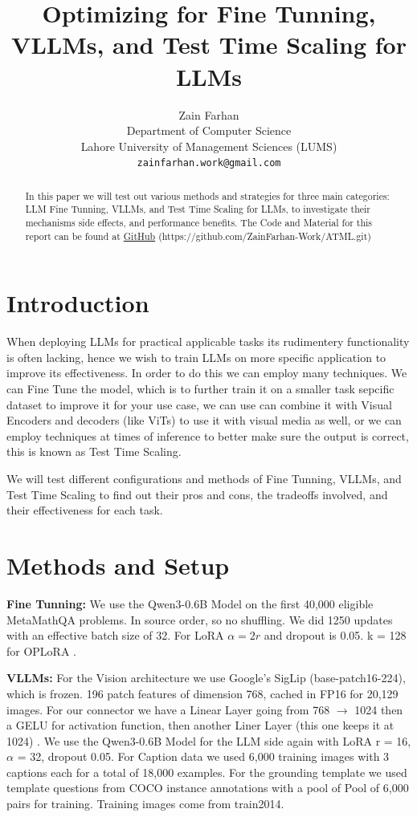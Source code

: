 \documentclass{article}
\title{Optimizing for Fine Tunning, VLLMs, and Test Time Scaling for LLMs}
\author{%
  Zain Farhan \\
  Department of Computer Science \\
  Lahore University of Management Sciences (LUMS) \\
  \texttt{zainfarhan.work@gmail.com} \\
}
\begin{document}
\maketitle


\begin{abstract}
  In this paper we will test out various methods and strategies for three main categories:
  LLM Fine Tunning, VLLMs, and Test Time Scaling for LLMs, to investigate their mechanisms side effects,
  and performance benefits. The Code and Material for this report can be found at \hyperlink{https://github.com/ZainFarhan-Work/ATML.git}{GitHub} (https://github.com/ZainFarhan-Work/ATML.git)
\end{abstract}



\section{Introduction}

When deploying LLMs for practical applicable tasks its rudimentery functionality is often lacking, hence we wish to train LLMs on more specific application to improve its effectiveness.
In order to do this we can employ many techniques. We can Fine Tune the model, which is to further train it on a smaller task sepcific dataset to improve it for your use case, we can use
can combine it with Visual Encoders and decoders (like ViTs) to use it with visual media as well, or we can employ techniques at times of inference to better make sure the output is correct,
this is known as Test Time Scaling.

We will test different configurations and methods of Fine Tunning, VLLMs, and Test Time Scaling to find out their pros and cons, the tradeoffs involved, and their effectiveness for each task.

\section{Methods and Setup}

\textbf{Fine Tunning:} We use the Qwen3-0.6B Model on the first 40,000 eligible MetaMathQA problems. In source order, so no shuffling.
We did 1250 updates with an effective batch size of 32. For LoRA $\alpha = 2r$ and dropout is 0.05. k = 128 for OPLoRA \citep{xiong2025oplora}.

\textbf{VLLMs:} For the Vision architecture we use Google's SigLip (base-patch16-224), which is frozen. 196 patch features of dimension 768, cached in FP16 for 20,129 images. For our connector we have a Linear Layer
going from 768 $\rightarrow$ 1024 then a GELU for activation function, then another Liner Layer (this one keeps it at 1024) \citep{liu2023llava}. We use the Qwen3-0.6B Model for the LLM side again with LoRA r = 16, $\alpha$ = 32, dropout 0.05.
For Caption data we used 6,000 training images with 3 captions each for a total of 18,000 examples. For the grounding template we used template questions from COCO instance annotations with a pool of
Pool of 6,000 pairs for training. Training images come from train2014.
\end{document}
